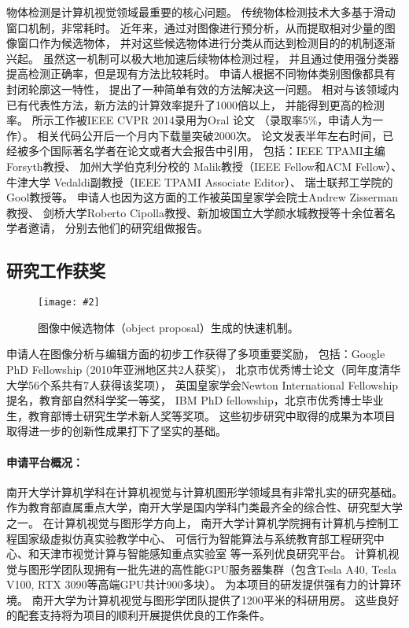 \documentclass[12pt]{article}
\newcommand{\addImg}[2][1.0]{\texttt{[image: \#2]}}
\newcommand{\myPara}[1]{\paragraph{#1：}}
\begin{document}
物体检测是计算机视觉领域最重要的核心问题。
传统物体检测技术大多基于滑动窗口机制，非常耗时。
近年来，通过对图像进行预分析，从而提取相对少量的图像窗口作为候选物体，
并对这些候选物体进行分类从而达到检测目的的机制逐渐兴起。
虽然这一机制可以极大地加速后续物体检测过程，
并且通过使用强分类器提高检测正确率，但是现有方法比较耗时。
申请人根据不同物体类别图像都具有封闭轮廓这一特性，
提出了一种简单有效的方法解决这一问题。
相对与该领域内已有代表性方法，新方法的计算效率提升了1000倍以上，
并能得到更高的检测率。
所示工作被IEEE CVPR 2014录用为Oral 论文
（录取率5\%，申请人为一作）。
相关代码公开后一个月内下载量突破2000次。
论文发表半年左右时间，已经被多个国际著名学者在论文或者大会报告中引用，
包括：IEEE TPAMI主编 Forsyth教授、
加州大学伯克利分校的 Malik教授（IEEE Fellow和ACM Fellow）、
牛津大学 Vedaldi副教授（IEEE TPAMI Associate Editor）、
瑞士联邦工学院的Gool教授等。
申请人也因为这方面的工作被英国皇家学会院士Andrew Zisserman教授、
剑桥大学Roberto Cipolla教授、新加坡国立大学颜水城教授等十余位著名学者邀请，
分别去他们的研究组做报告。


\subsection{研究工作获奖}


\begin{figure}[ht]
    \centering
    \addImg[.8]{figures/awards.jpg}
    \caption{图像中候选物体（object proposal）生成的快速机制。}
    \label{fig:award}
\end{figure}

申请人在图像分析与编辑方面的初步工作获得了多项重要奖励，
包括：Google PhD Fellowship (2010年亚洲地区共2人获奖)，
北京市优秀博士论文（同年度清华大学56个系共有7人获得该奖项），
英国皇家学会Newton International Fellowship提名，教育部自然科学奖一等奖，
IBM PhD fellowship，北京市优秀博士毕业生，教育部博士研究生学术新人奖等奖项。
这些初步研究中取得的成果为本项目取得进一步的创新性成果打下了坚实的基础。




\myPara{申请平台概况}
南开大学计算机学科在计算机视觉与计算机图形学领域具有非常扎实的研究基础。
作为教育部直属重点大学，南开大学是国内学科门类最齐全的综合性、研究型大学之一。
在计算机视觉与图形学方向上，
南开大学计算机学院拥有计算机与控制工程国家级虚拟仿真实验教学中心、
可信行为智能算法与系统教育部工程研究中心、和天津市视觉计算与智能感知重点实验室
等一系列优良研究平台。
计算机视觉与图形学团队现拥有一批先进的高性能GPU服务器集群（包含Tesla A40, Tesla V100, RTX 3090等高端GPU共计900多块）。
% 
为本项目的研发提供强有力的计算环境。
南开大学为计算机视觉与图形学团队提供了1200平米的科研用房。
这些良好的配套支持将为项目的顺利开展提供优良的工作条件。
\end{document}
